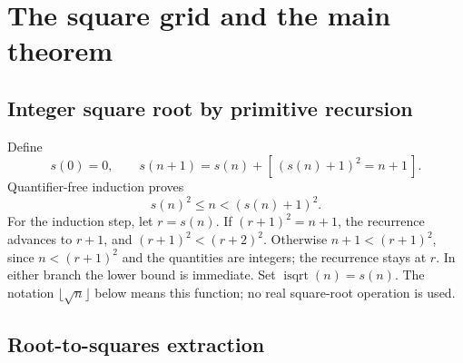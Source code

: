 \documentclass[11pt,letterpaper]{article}
\theoremstyle{definition}
\theoremstyle{remark}
\newcommand{\sqroot}{\operatorname{isqrt}}
\newcommand{\ind}[1]{[\,#1\,]}
\begin{document}
\section{The square grid and the main theorem}
\label{sec:grid}

\subsection{Integer square root by primitive recursion}

Define
\[
 s(0)=0,\qquad
 s(n+1)=s(n)+\ind{(s(n)+1)^2=n+1}.
\]
Quantifier-free induction proves
\begin{equation}
 s(n)^2\le n<(s(n)+1)^2.
 \label{eq:sqrt}
\end{equation}
For the induction step, let \(r=s(n)\). If \((r+1)^2=n+1\), the
recurrence advances to \(r+1\), and \((r+1)^2<(r+2)^2\).
Otherwise \(n+1<(r+1)^2\), since \(n<(r+1)^2\) and the quantities are
integers; the recurrence stays at \(r\).
In either branch the lower bound is immediate. Set \(\sqroot(n)=s(n)\).
The notation \(\lfloor\sqrt n\rfloor\) below means this function; no
real square-root operation is used.

\subsection{Root-to-squares extraction}
\end{document}
